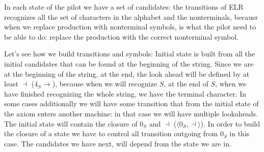			In each state of the pilot we have a set of candidates: the transitions of ELR recognizes all the set of characters in the alphabet and the 
			nonterminals, becausr when we replace production with nonterminal symbols, is what the pilot need to be able to do: replace the production with the 
			correct nonterminal symbol.

			Let's see how we build transitions and symbols:
			Initial state is built from all the initial candidates that can be found at the beginning of the string. Since we are at the beginning of the 
			string, at the end, the look ahead will be defined by at least $\dashv$ ($4_S\longrightarrow$), because when we will recognize $S$, at the end of $S$,
			when we have finished recognizing the whole string, we have the terminal character. In some cases additionally we will have some transition that 
			from the initial state of the axiom enters another machine: in that case we will have multiple lookaheads. The initial state will contain the closure 
			of $0_S$ and $\dashv$ ($\langle 0_S,\dashv\rangle$). In order to build the closure of a state we have to control all transition outgoing from $0_S$ in 
			this case. The candidates we have next, will depend from the state we are in.

